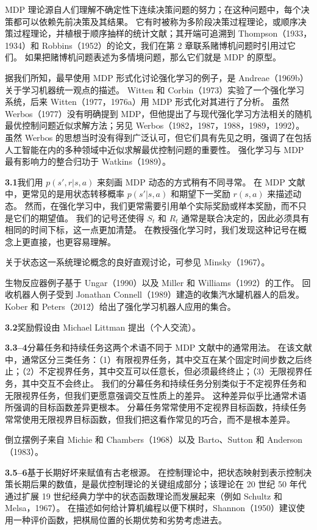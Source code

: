 \documentclass[UTF8, 12pt, fontset=fandol, oneside]{ctexart}
\begin{document}
MDP 理论源自人们理解不确定性下连续决策问题的努力；在这种问题中，每个决策都可以依赖先前决策及其结果。
它有时被称为多阶段决策过程理论，或顺序决策过程理论，并植根于顺序抽样的统计文献；其开端可追溯到 Thompson（1933，1934）和 Robbins（1952）的论文，我们在第 2 章联系赌博机问题时引用过它们。
如果把赌博机问题表述为多情境问题，那么它们就是 MDP 的原型。

据我们所知，最早使用 MDP 形式化讨论强化学习的例子，是 Andreae（1969b）关于学习机器统一观点的描述。
Witten 和 Corbin（1973）实验了一个强化学习系统，后来 Witten（1977，1976a）用 MDP 形式化对其进行了分析。
虽然 Werbos（1977）没有明确提到 MDP，但他提出了与现代强化学习方法相关的随机最优控制问题近似求解方法；另见 Werbos（1982，1987，1988，1989，1992）。
虽然 Werbos 的思想当时没有得到广泛认可，但它们具有先见之明，强调了在包括人工智能在内的多种领域中近似求解最优控制问题的重要性。
强化学习与 MDP 最有影响力的整合归功于 Watkins（1989）。

\noindent\textbf{3.1}\quad 我们用 $p(s',r|s,a)$ 来刻画 MDP 动态的方式稍有不同寻常。
在 MDP 文献中，更常见的是用状态转移概率 $p(s'|s,a)$ 和期望下一奖励 $r(s,a)$ 来描述动态。
然而，在强化学习中，我们更常需要引用单个实际奖励或样本奖励，而不只是它们的期望值。
我们的记号还使得 $S_t$ 和 $R_t$ 通常是联合决定的，因此必须具有相同的时间下标，这一点更加清楚。
在教授强化学习时，我们发现这种记号在概念上更直接，也更容易理解。

关于状态这一系统理论概念的良好直观讨论，可参见 Minsky（1967）。

生物反应器例子基于 Ungar（1990）以及 Miller 和 Williams（1992）的工作。
回收机器人例子受到 Jonathan Connell（1989）建造的收集汽水罐机器人的启发。
Kober 和 Peters（2012）给出了强化学习机器人应用的集合。

\noindent\textbf{3.2}\quad 奖励假设由 Michael Littman 提出（个人交流）。

\noindent\textbf{3.3--4}\quad 分幕任务和持续任务这两个术语不同于 MDP 文献中的通常用法。
在该文献中，通常区分三类任务：（1）有限视界任务，其中交互在某个固定时间步数之后终止；（2）不定视界任务，其中交互可以任意长，但必须最终终止；（3）无限视界任务，其中交互不会终止。
我们的分幕任务和持续任务分别类似于不定视界任务和无限视界任务，但我们更愿意强调交互性质上的差异。
这种差异似乎比通常术语所强调的目标函数差异更根本。
分幕任务常常使用不定视界目标函数，持续任务常常使用无限视界目标函数，但我们把这看作常见的巧合，而不是根本差异。

倒立摆例子来自 Michie 和 Chambers（1968）以及 Barto、Sutton 和 Anderson（1983）。

\noindent\textbf{3.5--6}\quad 基于长期好坏来赋值有古老根源。
在控制理论中，把状态映射到表示控制决策长期后果的数值，是最优控制理论的关键组成部分；该理论在 20 世纪 50 年代通过扩展 19 世纪经典力学中的状态函数理论而发展起来（例如 Schultz 和 Melsa，1967）。
在描述如何给计算机编程以便下棋时，Shannon（1950）建议使用一种评价函数，把棋局位置的长期优势和劣势考虑进去。
\end{document}
